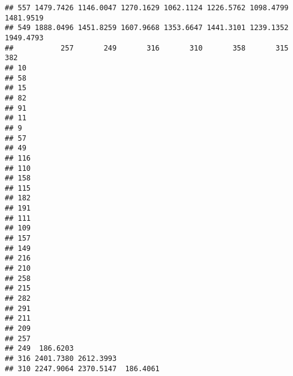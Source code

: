\documentclass[
]{article}
\begin{document}
\begin{verbatim}
## 557 1479.7426 1146.0047 1270.1629 1062.1124 1226.5762 1098.4799 1481.9519
## 549 1888.0496 1451.8259 1607.9668 1353.6647 1441.3101 1239.1352 1949.4793
##           257       249       316       310       358       315       382
## 10                                                                       
## 58                                                                       
## 15                                                                       
## 82                                                                       
## 91                                                                       
## 11                                                                       
## 9                                                                        
## 57                                                                       
## 49                                                                       
## 116                                                                      
## 110                                                                      
## 158                                                                      
## 115                                                                      
## 182                                                                      
## 191                                                                      
## 111                                                                      
## 109                                                                      
## 157                                                                      
## 149                                                                      
## 216                                                                      
## 210                                                                      
## 258                                                                      
## 215                                                                      
## 282                                                                      
## 291                                                                      
## 211                                                                      
## 209                                                                      
## 257                                                                      
## 249  186.6203                                                            
## 316 2401.7380 2612.3993                                                  
## 310 2247.9064 2370.5147  186.4061                                        

\end{verbatim}
\end{document}
